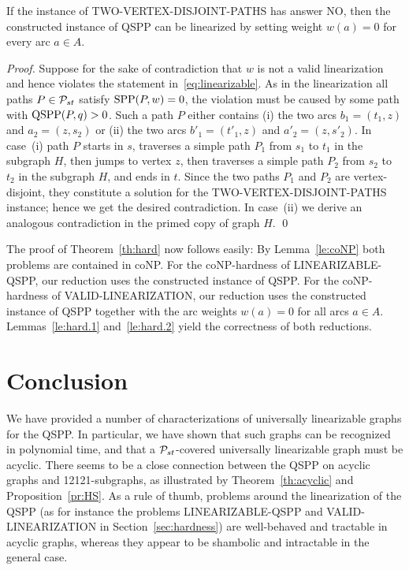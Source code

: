 \documentclass[runningheads]{llncs}
\begin{document}
\begin{appendix}
\begin{lemma}
\label{le:hard.2}
If the instance of TWO-VERTEX-DISJOINT-PATHS has answer NO,
then the constructed instance of QSPP can be linearized by setting weight $w(a)=0$ for every arc $a\in A$.
\end{lemma}
\begin{proof}
Suppose for the sake of contradiction that $w$ is not a valid linearization and hence
violates the statement in~\eqref{eq:linearizable}.
As in the linearization all paths $P\in{\cal P}_{st}$ satisfy $\text{SPP}(P,w)=0$, the violation must
be caused by some path with $\text{QSPP}(P,q)>0$.
Such a path $P$ either contains (i) the two arcs $b_1=(t_1,z)$ and $a_2=(z,s_2)$ or
(ii) the two arcs $b'_1=(t'_1,z)$ and $a'_2=(z,s'_2)$.
In case~(i) path $P$ starts in $s$, traverses a simple path $P_1$ from $s_1$ to $t_1$
in the subgraph $H$, then jumps to vertex $z$, then traverses a simple path $P_2$ from
$s_2$ to $t_2$ in the subgraph $H$, and ends in $t$.
Since the two paths $P_1$ and $P_2$ are vertex-disjoint, they constitute a solution for
the TWO-VERTEX-DISJOINT-PATHS instance; hence we get the desired contradiction.
In case~(ii) we derive an analogous contradiction in the primed copy of graph $H$.
\qed
\end{proof}

The proof of Theorem~\ref{th:hard} now follows easily:
By Lemma~\ref{le:coNP} both problems are contained in coNP.
For the coNP-hardness of LINEARIZABLE-QSPP, our reduction uses the constructed instance of QSPP.
For the coNP-hardness of VALID-LINEARIZATION, our reduction uses the constructed instance of QSPP
together with the arc weights $w(a)=0$ for all arcs $a\in A$.
Lemmas~\ref{le:hard.1} and~\ref{le:hard.2} yield the correctness of both reductions.


\section{Conclusion}
\label{sec:conclusion}
We have provided a number of characterizations of universally linearizable graphs for the QSPP.
In particular, we have shown that such graphs can be recognized in polynomial time,
and that a ${\cal P}_{st}$-covered universally linearizable graph must be acyclic.
There seems to be a close connection between the QSPP on acyclic graphs and 12121-subgraphs,
as illustrated by Theorem~\ref{th:acyclic} and Proposition~\ref{pr:HS}.
As a rule of thumb, problems around the linearization of the QSPP (as for instance
the problems LINEARIZABLE-QSPP and VALID-LINEARIZATION in Section~\ref{sec:hardness})
are well-behaved and tractable in acyclic graphs, whereas they appear to be shambolic
and intractable in the general case.


\end{appendix}
\end{document}
